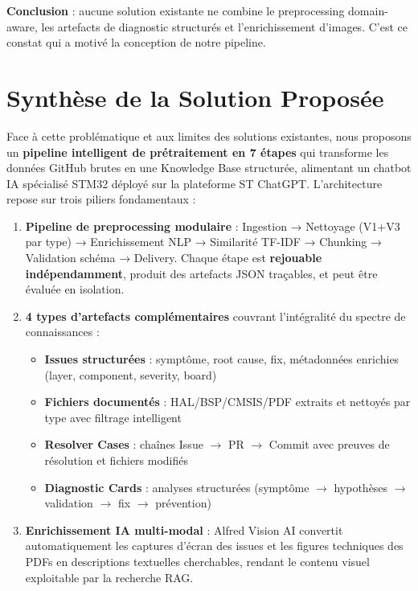 \documentclass[12pt,a4paper]{report}
\begin{document}
\textbf{Conclusion} : aucune solution existante ne combine le preprocessing domain-aware, les artefacts de diagnostic structurés et l'enrichissement d'images. C'est ce constat qui a motivé la conception de notre pipeline.

\section{Synthèse de la Solution Proposée}
\label{sec:solution_proposee}

Face à cette problématique et aux limites des solutions existantes, nous proposons un \textbf{pipeline intelligent de prétraitement en 7 étapes} qui transforme les données GitHub brutes en une Knowledge Base structurée, alimentant un chatbot IA spécialisé STM32 déployé sur la plateforme ST ChatGPT. L'architecture repose sur trois piliers fondamentaux :

\begin{enumerate}
  \item \textbf{Pipeline de preprocessing modulaire} : Ingestion → Nettoyage (V1+V3 par type) → Enrichissement NLP → Similarité TF-IDF → Chunking → Validation schéma → Delivery. Chaque étape est \textbf{rejouable indépendamment}, produit des artefacts JSON traçables, et peut être évaluée en isolation.
  
  \item \textbf{4 types d'artefacts complémentaires} couvrant l'intégralité du spectre de connaissances :
  \begin{itemize}
    \item \textbf{Issues structurées} : symptôme, root cause, fix, métadonnées enrichies (layer, component, severity, board)
    \item \textbf{Fichiers documentés} : HAL/BSP/CMSIS/PDF extraits et nettoyés par type avec filtrage intelligent
    \item \textbf{Resolver Cases} : chaînes Issue $\to$ PR $\to$ Commit avec preuves de résolution et fichiers modifiés
    \item \textbf{Diagnostic Cards} : analyses structurées (symptôme $\to$ hypothèses $\to$ validation $\to$ fix $\to$ prévention)
  \end{itemize}
  
  \item \textbf{Enrichissement IA multi-modal} : Alfred Vision AI convertit automatiquement les captures d'écran des issues et les figures techniques des PDFs en descriptions textuelles cherchables, rendant le contenu visuel exploitable par la recherche RAG.
\end{enumerate}
\end{document}
